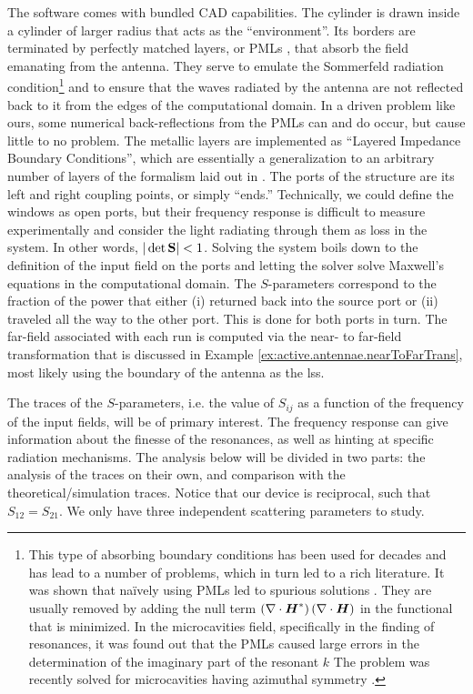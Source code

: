 The software comes with bundled CAD capabilities. The cylinder is drawn inside 
a cylinder of larger radius that acts as the ``environment''. Its borders are
terminated by perfectly matched layers, or PMLs \cite{BER1994}, that absorb the field emanating 
from the antenna. They serve to emulate the Sommerfeld radiation condition\footnote{
This type of absorbing boundary conditions has been used for decades and has lead
to a number of problems, which in turn led to a rich literature. It was shown that naïvely using 
PMLs led to spurious solutions \cite{KON1976,KOS1984,KOS1985}. They are usually removed by
adding the null term $\left(\nabla\cdot\boldsymbol{H}^*\right)\left(\nabla\cdot\boldsymbol{H}\right)$
in the functional that is minimized.
In the microcavities field, specifically in the finding of resonances, it was 
found out that the PMLs caused large errors in the determination of the
imaginary part of the resonant $k$ \cite{HOW1993,HOE1998,BOR2004} The problem
was recently solved for microcavities having azimuthal symmetry \cite{OXB2007,CHE2013}.}
and to ensure that the waves radiated by the antenna are not reflected back to it
from the edges of the computational domain. In a driven problem like ours, some
numerical back-reflections from the PMLs can and do occur, but cause little
to no problem. The metallic layers are implemented as ``Layered Impedance Boundary
Conditions'', which are essentially a generalization to an arbitrary number of
layers of the formalism laid out in \cite{MIT1968}. The ports of the structure
are its left and right coupling points, or simply ``ends.'' Technically, we could
define the windows as open ports, but their frequency response is difficult to 
measure experimentally and consider the light radiating through them as loss 
in the system. In other words, $|\det\mathbf{S}|<1$. Solving the system boils down
to the definition of the input field on the ports and letting the solver solve
Maxwell's equations in the computational domain. The $S$-parameters correspond
to the fraction of the power that either (i) returned back into the source port
or (ii) traveled all the way to the other port. This is done for both ports in turn. 
The far-field associated with each run is computed via the near- to far-field 
transformation that is discussed in Example \ref{ex:active.antennae.nearToFarTrans}, 
most likely using the boundary of the antenna as the \gls{lss}.

The traces of the $S$-parameters, i.e. the value of $S_{ij}$ as a function of 
the frequency of the input fields, will be of primary interest. The frequency
response can give information about the finesse of the resonances, as well as
hinting at specific radiation mechanisms. The analysis below will be divided
in two parts: the analysis of the traces on their own, and comparison with the 
theoretical/simulation traces. Notice that our device is reciprocal, such that
$S_{12}=S_{21}$. We only have three independent scattering parameters to study.

